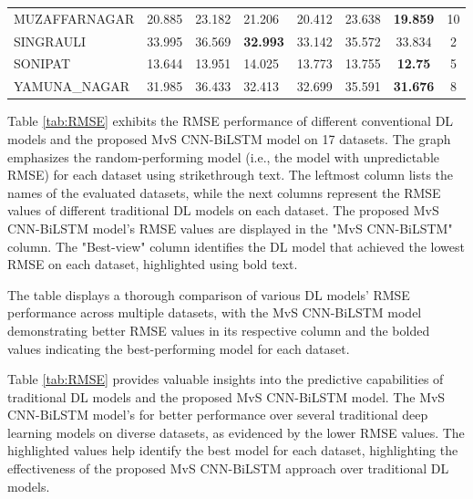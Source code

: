 \documentclass[a4paper,fleqn]{cas-dc}
\begin{document}
\begin{table}[]
{\begin{tabular}{llllllcc}
 MUZAFFARNAGAR  & 20.885          & 23.182    & 21.206          & 20.412     & 23.638                   & \textbf{19.859} & 10     \\
 SINGRAULI      & 33.995          & 36.569    & \textbf{32.993} & 33.142     & 35.572                    & 33.834          & 2      \\
 SONIPAT        & 13.644          & 13.951    & 14.025          & 13.773     & 13.755                    & \textbf{12.75}  & 5      \\
 YAMUNA\_NAGAR  & 31.985          & 36.433    & 32.413          & 32.699     & 35.591                    & \textbf{31.676} & 8     \\ \hline
  \end{tabular}%
  }
  \end{table}
  Table \ref{tab:RMSE} exhibits the RMSE performance of different conventional DL models and the proposed MvS CNN-BiLSTM model on 17 datasets. The graph emphasizes the random-performing model (i.e., the model with unpredictable RMSE) for each dataset using strikethrough text. The leftmost column lists the names of the evaluated datasets, while the next columns represent the RMSE values of different traditional DL models on each dataset. The proposed MvS CNN-BiLSTM model's RMSE values are displayed in the "MvS CNN-BiLSTM" column. The "Best-view" column identifies the DL model that achieved the lowest RMSE on each dataset, highlighted using bold text.

  The table displays a thorough comparison of various DL models' RMSE performance across multiple datasets, with the MvS CNN-BiLSTM model demonstrating better RMSE values in its respective column and the bolded values indicating the best-performing model for each dataset.
  
  Table \ref{tab:RMSE} provides valuable insights into the predictive capabilities of traditional DL models and the proposed MvS CNN-BiLSTM model. The MvS CNN-BiLSTM model's for better performance over several traditional deep learning models on diverse datasets, as evidenced by the lower RMSE values. The highlighted values help identify the best model for each dataset, highlighting the effectiveness of the proposed MvS CNN-BiLSTM approach over traditional DL models.
\end{document}
